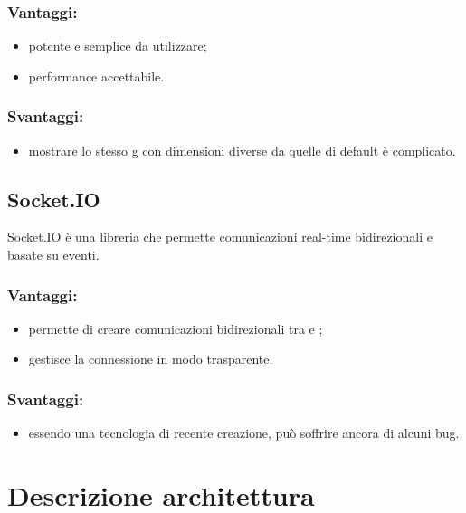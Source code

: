 \documentclass[a4paper, titlepage]{article}
\begin{document}
\subsubsection{Vantaggi:}

\begin{itemize}
	\item potente e semplice da utilizzare;
	\item performance accettabile.
\end{itemize}

\subsubsection{Svantaggi:}
\begin{itemize}
	\item mostrare lo stesso  g con dimensioni diverse da quelle di default è complicato.
\end{itemize}



\subsection{Socket.IO}
Socket.IO è una libreria  che permette comunicazioni real-time bidirezionali e basate su eventi.

\subsubsection{Vantaggi:}

\begin{itemize}
	\item permette di creare comunicazioni bidirezionali tra  e ;
	\item gestisce la connessione in modo trasparente.
\end{itemize}

\subsubsection{Svantaggi:}

\begin{itemize}
	\item essendo una tecnologia di recente creazione, può soffrire ancora di alcuni bug.
\end{itemize}

\newpage
	\section{Descrizione architettura}
\end{document}

